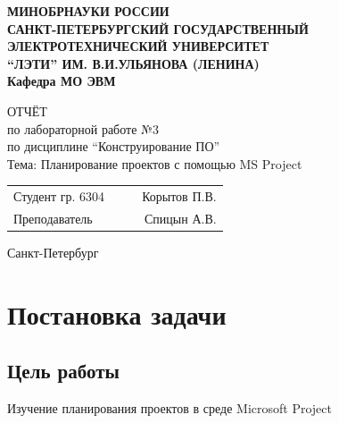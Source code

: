 \documentclass[a4paper, 14pt]{extarticle}
\begin{document}
\begin{titlepage}
    \centering
    {\bfseries
        \uppercase{
            Минобрнауки России \\
            Санкт-Петербургский государственный \\
            Электротехнический университет \\
            \enquote{ЛЭТИ} им. В.И.Ульянова (Ленина)\\
        }
        Кафедра МО ЭВМ

        \vspace{\fill}
        \uppercase{Отчёт} \\
        по лабораторной работе №3 \\
        по дисциплине \enquote{Конструирование ПО} \\
        Тема: Планирование проектов с помощью MS Project
    }

    \vspace{\fill}
    \begin{tabularx}{0.8\textwidth}{l X c r}
        Студент гр. 6304 & & \underline{\hspace{3cm}} & Корытов П.В.\\
        Преподаватель & & \underline{\hspace{3cm}} & Спицын А.В.
    \end{tabularx}

    \vspace{1cm}
    Санкт-Петербург \\
    \the\year{}
\end{titlepage}

\tableofcontents
\newpage

\section{Постановка задачи}
\subsection{Цель работы}
Изучение планирования проектов в среде Microsoft Project
\end{document}
